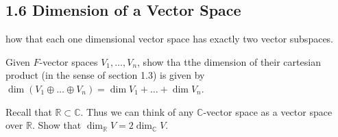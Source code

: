 \subsection*{1.6 Dimension of a Vector Space}
\item how that each one dimensional vector space has exactly two vector subspaces.
\item Given $F$-vector spaces $V_{1}, \dots, V_{n}$, show tha tthe dimension of their cartesian product (in the sense of section 1.3) is given by $\dim (V_{1} \oplus \dots \oplus V_{n}) = \dim V_{1} + \dots + \dim V_{n}$.
\item Recall that $\mathbb{R} \subset \mathbb{C}$. Thus we can think of any $\mathbb{C}$-vector space as a vector space over $\mathbb{R}$. Show that $\dim_{\mathbb{R}} V = 2 \dim_{\mathbb{C}} V$.
